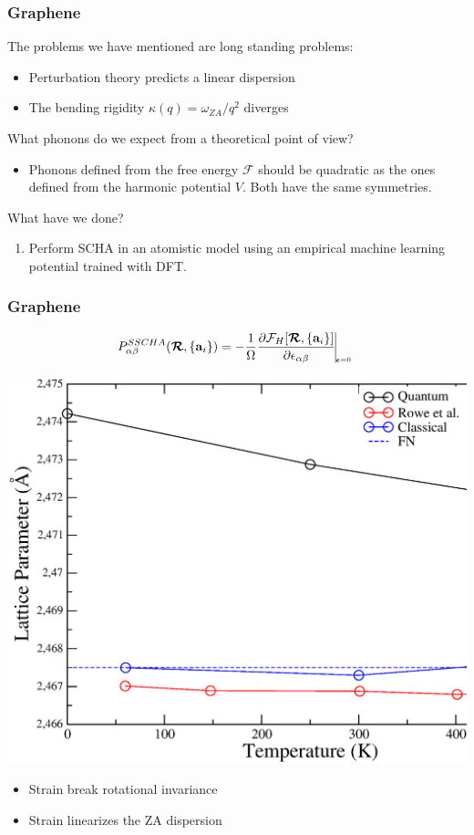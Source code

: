 \documentclass{beamer}
\begin{document}
\begin{frame}

\frametitle{Graphene}
The problems we have mentioned are long standing problems:
\begin{itemize}
\item Perturbation theory predicts a linear dispersion
\item The bending rigidity $\kappa(q)=\omega_{ZA}/q^{2}$ diverges
\end{itemize}
What phonons do we expect from a theoretical point of view?
\begin{itemize}
\item Phonons defined from the free energy $\mathcal{F}$ should be quadratic as the ones defined from the harmonic potential $V$. Both have the same symmetries.
\end{itemize}
What have we done?
\begin{enumerate}
 \item Perform SCHA in an atomistic model using an empirical machine learning potential trained with DFT.
\end{enumerate}

\end{frame}


\begin{frame}

\frametitle{Graphene}
\begin{equation}
\nonumber
 P_{\alpha\beta}^{SSCHA}(\boldsymbol{\mathcal{R}},\{\mathbf{a}_{i}\})=-\frac{1}{\Omega}\frac{\partial\mathcal{F}_{H}[\boldsymbol{\mathcal{R}},\{\mathbf{a}_{i}\}]}{\partial\epsilon_{\alpha\beta}}\vline_{_{_{_{_{_{_{_{
\boldsymbol{\epsilon}=0}}}}}}}}
\end{equation}
\begin{center}
 \includegraphics[width=0.60\linewidth]{Pictures/Graphene/lattice-new1.eps}
\end{center}
\begin{itemize}
 \item Strain break rotational invariance
 \item Strain linearizes the ZA dispersion
\end{itemize}

\end{frame}
\end{document}

